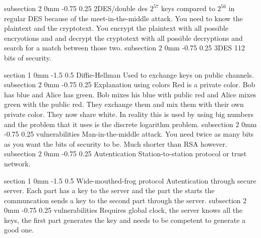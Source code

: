 \documentclass[a4paper,11pt]{article}
\makeatletter
\renewcommand{\section}{\@startsection
   {section}%
   {1}%
   {0mm}%
   {-1.5\baselineskip}%
   {0.5\baselineskip}%
   {\sffamily\bfseries\upshape\normalsize}}%
\renewcommand{\subsection}{\@startsection
   {subsection}%
   {2}%
   {0mm}%
   {-0.75\baselineskip}%
   {0.25\baselineskip}%
   {\rmfamily\normalfont\slshape\normalsize}}%
\makeatother
\begin{document}
\subsection{2DES/double des}
$2^{57}$ keys compared to $2^{56} $ in regular DES because of the meet-in-the-middle attack. You need to know the plaintext and the cryptotext. You encrypt the plaintext with all possible encryotions and and decrypt the cryptotext with all possible decryptions and search for a match between those two.
\subsection{3DES}
112 bits of security.

\section{Diffie-Hellman}
Used to exchange keys on public channels. 
\subsection{Explanation using colors}
Red is a private color. Bob has blue and Alice has green. Bob mixes his blue with public red and Alice mixes green with the public red. They exchange them and mix them with their own private color. They now share white. In reality this is used by using big numbers and the problem that it uses is the discrete logarithm problem. 
\subsection{vulnerabilities}
Man-in-the-middle attack. You need twice as many bits as you want the bits of security to be. Much shorter than RSA however.
\subsection{Autentication}
Station-to-station protocol or trust network.

\section{Wide-mouthed-frog protocol}
Autentication through secure server. Each part has a key to the server and the part the starts the communcation sends a key to the second part through the server.
\subsection{vulnerabilities}
Requires global clock, the server knows all the keys, the first part generates the key and needs to be competent to generate a good one.
\end{document}
